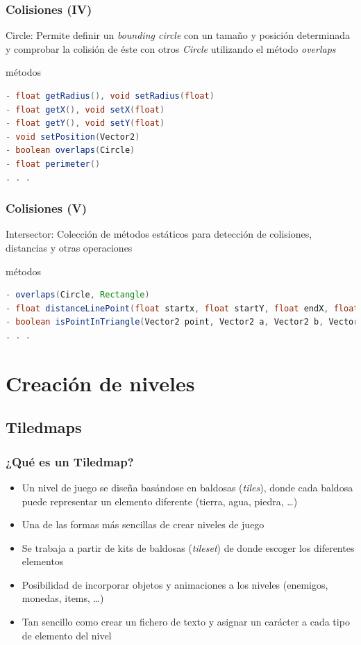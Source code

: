 \documentclass[xcolor={dvipsnames}]{beamer}
\begin{document}
\begin{frame}[fragile]\frametitle{Colisiones (IV)}
    \textcolor{resalta}{Circle}: Permite definir un \emph{bounding circle} con un tamaño y posición determinada y comprobar la
        colisión de éste con otros \emph{Circle} utilizando el método \emph{overlaps}
    \begin{exampleblock}{métodos}
    \begin{lstlisting}[language=java]
- float getRadius(), void setRadius(float)
- float getX(), void setX(float)
- float getY(), void setY(float)
- void setPosition(Vector2)
- boolean overlaps(Circle)
- float perimeter()
. . .
    \end{lstlisting}
    \end{exampleblock}
\end{frame}

\begin{frame}[fragile]\frametitle{Colisiones (V)}
    \textcolor{resalta}{Intersector}: Colección de métodos estáticos para detección de colisiones, distancias y otras operaciones
    \begin{exampleblock}{métodos}
    \begin{lstlisting}[language=java]
- overlaps(Circle, Rectangle)
- float distanceLinePoint(float startx, float startY, float endX, float endY, float pointX, float pointY)
- boolean isPointInTriangle(Vector2 point, Vector2 a, Vector2 b, Vector2 c)
. . .
    \end{lstlisting}
    \end{exampleblock}
\end{frame}

\section{Creación de niveles}
\subsection{Tiledmaps}
\begin{frame}\frametitle{¿Qué es un Tiledmap?}
    \begin{itemize}
        \item Un nivel de juego se diseña basándose en baldosas (\emph{tiles}), donde cada baldosa puede representar un elemento diferente
        (tierra, agua, piedra, \ldots)
        \item Una de las formas más sencillas de crear niveles de juego
        \item Se trabaja a partir de kits de baldosas (\emph{tileset}) de donde escoger los diferentes elementos
        \item Posibilidad de incorporar objetos y animaciones a los niveles (enemigos, monedas, items, \ldots)
        \item Tan sencillo como crear un fichero de texto y asignar un carácter a cada tipo de elemento del nivel
    \end{itemize}
\end{frame}
\end{document}
